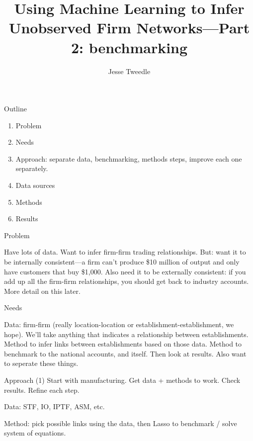 \documentclass[12pt]{beamer}
\begin{document}
\title{Using Machine Learning to Infer Unobserved Firm Networks---Part 2: benchmarking}
\author{Jesse Tweedle}

\begin{frame}{}

\maketitle

\end{frame}

\begin{frame}{Outline}
\begin{enumerate}
\item Problem
\item Needs
\item Approach: separate data, benchmarking, methods steps, improve each one separately.
\item Data sources
\item Methods
\item Results
\end{enumerate}
\end{frame}

\begin{frame}{Problem}

Have lots of data. Want to infer firm-firm trading relationships. But: want it to be internally consistent---a firm can't produce \$10 million of output and only have customers that buy \$1,000. Also need it to be externally consistent: if you add up all the firm-firm relationships, you should get back to industry accounts. More detail on this later.

\end{frame}

\begin{frame}{Needs}

Data: firm-firm (really location-location or establishment-establishment, we hope). We'll take anything that indicates a relationship between establishments. Method to infer links between establishments based on those data.  Method to benchmark to the national accounts, and itself. Then look at results. Also want to seperate these things. 

\end{frame}

\begin{frame}{Approach}
(1) Start with manufacturing. Get data + methods to work. Check results. Refine each step.  

Data: STF, IO, IPTF, ASM, etc.

Method: pick possible links using the data, then Lasso to benchmark / solve system of equations.

\end{frame}
\end{document}
